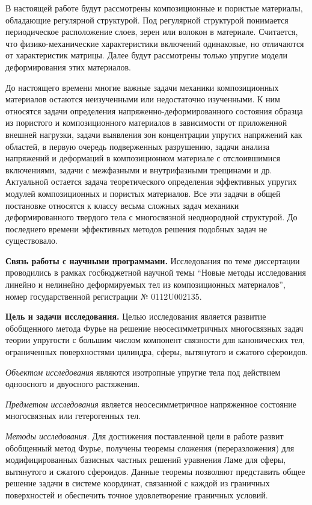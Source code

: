 В настоящей работе будут рассмотрены композиционные и пористые материалы, обладающие регулярной структурой. Под регулярной структурой понимается периодическое расположение слоев, зерен или волокон в материале. Считается, что фи\-зи\-ко-\-ме\-ха\-ни\-че\-ские характеристики включений одинаковые, но отличаются от характеристик матрицы. Далее будут рассмотрены только упругие модели деформирования этих материалов.

До настоящего времени многие важные задачи механики композиционных материалов остаются неизученными или недостаточно изученными. К ним относятся задачи определения напряженно-деформированного состояния образца из пористого и композиционного материалов в зависимости от приложенной внешней нагрузки, задачи выявления зон концентрации упругих напряжений как областей, в первую очередь подверженных разрушению, задачи анализа напряжений и деформаций в композиционном материале с отслоившимися включениями, задачи с межфазными и внутрифазными трещинами и др. Актуальной остается задача теоретического определения эффективных упругих модулей композиционных и пористых материалов. Все эти задачи в общей постановке относятся к классу весьма сложных задач механики деформированного твердого тела с многосвязной неоднородной структурой. До последнего времени эффективных методов решения подобных задач не существовало.

{\bf Связь работы с научными программами.} Исследования по теме диссертации проводились в рамках госбюджетной научной темы ``Новые методы исследования линейно и нелинейно деформируемых тел из композиционных материалов'', номер государственной регистрации № 0112U002135. 

{\bf Цель и задачи исследования.} Целью исследования является развитие обобщенного метода Фурье на решение неосесимметричных многосвязных задач теории упругости с большим числом компонент связности для канонических тел, ограниченных поверхностями цилиндра, сферы, вытянутого и сжатого сфероидов. 

{\it Объектом исследования} являются изотропные упругие тела под действием одноосного и двуосного растяжения.

{\it Предметом исследования} является неосесимметричное напряженное состояние многосвязных или гетерогенных тел.

{\it Методы исследования.} Для достижения поставленной цели в работе развит обобщенный метод Фурье, получены теоремы сложения (переразложения) для модифицированных базисных частных решений уравнения Ламе для сферы, вытянутого и сжатого сфероидов. Данные теоремы позволяют представить общее решение задачи в системе координат, связанной с каждой из граничных поверхностей и обеспечить точное удовлетворение граничных условий.

